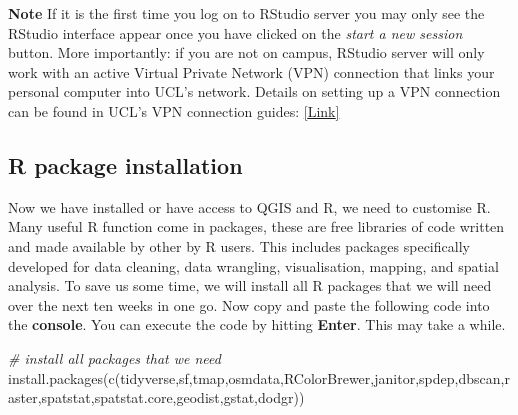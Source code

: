 \documentclass[
]{book}
\newenvironment{Shaded}{\begin{snugshade}}{\end{snugshade}}
\newcommand{\CommentTok}[1]{\textcolor[rgb]{0.56,0.35,0.01}{\textit{#1}}}
\newcommand{\FunctionTok}[1]{\textcolor[rgb]{0.00,0.00,0.00}{#1}}
\newcommand{\NormalTok}[1]{#1}
\newcommand{\StringTok}[1]{\textcolor[rgb]{0.31,0.60,0.02}{#1}}
\begin{document}
\textbf{Note}
If it is the first time you log on to RStudio server you may only see the RStudio interface appear once you have clicked on the \emph{start a new session} button. More importantly: if you are not on campus, RStudio server will only work with an active Virtual Private Network (VPN) connection that links your personal computer into UCL's network. Details on setting up a VPN connection can be found in UCL's VPN connection guides: \href{https://www.ucl.ac.uk/isd/services/get-connected/ucl-virtual-private-network-vpn}{{[}Link{]}}

\hypertarget{r-package-installation}{%
\subsection{R package installation}\label{r-package-installation}}

Now we have installed or have access to QGIS and R, we need to customise R. Many useful R function come in packages, these are free libraries of code written and made available by other by R users. This includes packages specifically developed for data cleaning, data wrangling, visualisation, mapping, and spatial analysis. To save us some time, we will install all R packages that we will need over the next ten weeks in one go. Now copy and paste the following code into the \textbf{console}. You can execute the code by hitting \textbf{Enter}. This may take a while.

\begin{Shaded}
\begin{Highlighting}[]
\CommentTok{\# install all packages that we need}
\FunctionTok{install.packages}\NormalTok{(}\FunctionTok{c}\NormalTok{(}\StringTok{\textquotesingle{}tidyverse\textquotesingle{}}\NormalTok{,}\StringTok{\textquotesingle{}sf\textquotesingle{}}\NormalTok{,}\StringTok{\textquotesingle{}tmap\textquotesingle{}}\NormalTok{,}\StringTok{\textquotesingle{}osmdata\textquotesingle{}}\NormalTok{,}\StringTok{\textquotesingle{}RColorBrewer\textquotesingle{}}\NormalTok{,}\StringTok{\textquotesingle{}janitor\textquotesingle{}}\NormalTok{,}\StringTok{\textquotesingle{}spdep\textquotesingle{}}\NormalTok{,}\StringTok{\textquotesingle{}dbscan\textquotesingle{}}\NormalTok{,}\StringTok{\textquotesingle{}raster\textquotesingle{}}\NormalTok{,}\StringTok{\textquotesingle{}spatstat\textquotesingle{}}\NormalTok{,}\StringTok{\textquotesingle{}spatstat.core\textquotesingle{}}\NormalTok{,}\StringTok{\textquotesingle{}geodist\textquotesingle{}}\NormalTok{,}\StringTok{\textquotesingle{}gstat\textquotesingle{}}\NormalTok{,}\StringTok{\textquotesingle{}dodgr\textquotesingle{}}\NormalTok{))}
\end{Highlighting}
\end{Shaded}
\end{document}
